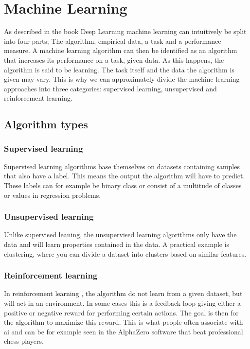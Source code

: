     
    
    
    
\section{Machine Learning} \label{Machine Learning}
    As described in the book Deep Learning\cite{Goodfellow-et-al-2016_ML} machine learning can intuitively be split into four parts; The algorithm, empirical data, a task and a performance measure. A machine learning algorithm can then be identified as an algorithm that increases its performance on a task, given data. As this happens, the algorithm is said to be learning. The task itself and the data the algorithm is given may vary. This is why we can approximately divide the machine learning approaches into three categories\cite{Goodfellow-et-al-2016_E}: supervised learning, unsupervised and reinforcement learning. 
    
    \subsection{Algorithm types} \label{Algorithm types}
        \subsubsection{Supervised learning}
            Supervised learning \cite{Goodfellow-et-al-2016_E} algorithms base themselves on datasets containing samples that also have a label. This means the output the algorithm will have to predict. These labels can for example be binary class or consist of a multitude of classes or values in regression problems.
            
        \subsubsection{Unsupervised learning}
            Unlike supervised leaning, the unsupervised learning \cite{Goodfellow-et-al-2016_E} algorithms only have the data and will learn properties contained in the data. A practical example is clustering, where you can divide a dataset into clusters based on similar features. 
                
        \subsubsection{Reinforcement learning}
            In reinforcement learning \cite{Goodfellow-et-al-2016_E}, the algorithm do not learn from a given dataset, but will act in an environment. In some cases this is a feedback loop giving either a positive or negative reward for performing certain actions. The goal is then for the algorithm to maximize this reward. This is what people often associate with \gls{ai} and can be for example seen in the AlphaZero software that beat professional chess players\cite{silver2017mastering}.
    
